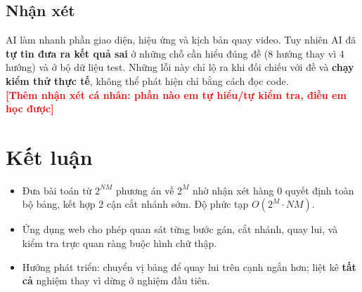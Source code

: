 \documentclass[12pt,a4paper]{article}
\newcommand{\todo}[1]{\textcolor{red}{\textbf{[#1]}}}
\begin{document}
\subsection{Nhận xét}
AI làm nhanh phần giao diện, hiệu ứng và kịch bản quay video. Tuy nhiên AI đã \textbf{tự tin đưa ra kết quả sai} ở những chỗ cần hiểu đúng đề (8 hướng thay vì 4 hướng) và ở bộ dữ liệu test. Những lỗi này chỉ lộ ra khi đối chiếu với đề và \textbf{chạy kiểm thử thực tế}, không thể phát hiện chỉ bằng cách đọc code. \\
\todo{Thêm nhận xét cá nhân: phần nào em tự hiểu/tự kiểm tra, điều em học được}

\section{Kết luận}
\begin{itemize}
    \item Đưa bài toán từ $2^{NM}$ phương án về $2^M$ nhờ nhận xét hàng $0$ quyết định toàn bộ bảng, kết hợp 2 cận cắt nhánh sớm. Độ phức tạp $O(2^M \cdot NM)$.
    \item Ứng dụng web cho phép quan sát từng bước gán, cắt nhánh, quay lui, và kiểm tra trực quan ràng buộc hình chữ thập.
    \item Hướng phát triển: chuyển vị bảng để quay lui trên cạnh ngắn hơn; liệt kê \textbf{tất cả} nghiệm thay vì dừng ở nghiệm đầu tiên.
\end{itemize}
\end{document}
